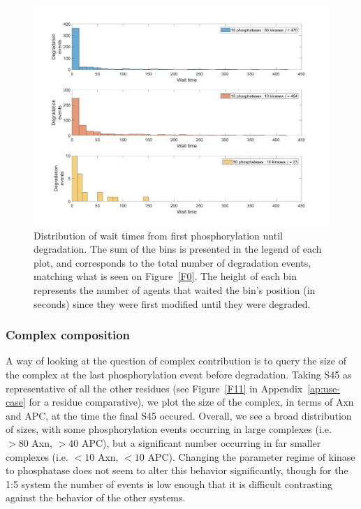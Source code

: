 \begin{figure}[h]
  \centering
  \includegraphics[width=\columnwidth]{wnt/F2_wait_times.png}
  \caption{Distribution of wait times from first phosphorylation until
    degradation. The sum of the bins is presented in the legend of
    each plot, and corresponds to the total number of degradation
    events, matching what is seen on Figure~\ref{F0}. The height of
    each bin represents the number of agents that waited the bin's
    position (in seconds) since they were first modified until they
    were degraded.}
  \label{F2}
\end{figure}


\subsubsection*{Complex composition}

A way of looking at the question of complex contribution is to query
the size of the complex at the last phosphorylation event before
degradation. Taking S45 as representative of all the other residues
(see Figure~\ref{F11} in Appendix~\ref{ap:use-case} for a residue comparative),
we plot the size of the complex, in terms of Axn and APC, at the time
the final S45 occured.  Overall, we see a broad distribution of sizes,
with some phosphorylation events occurring in large complexes
(i.e. $>80$ Axn, $>40$ APC), but a significant number occurring in far
smaller complexes (i.e. $<10$ Axn, $<10$ APC). Changing the parameter
regime of kinase to phosphatase does not seem to alter this behavior
significantly, though for the 1:5 system the number of events is low
enough that it is difficult contrasting against the behavior of the
other systems.

